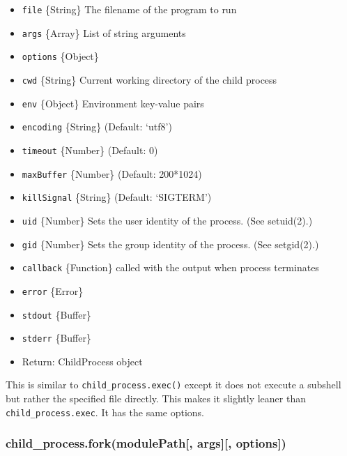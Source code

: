 \begin{itemize}
\itemsep1pt\parskip0pt
\item
  \texttt{file} \{String\} The filename of the program to run
\item
  \texttt{args} \{Array\} List of string arguments
\item
  \texttt{options} \{Object\}
\item
  \texttt{cwd} \{String\} Current working directory of the child process
\item
  \texttt{env} \{Object\} Environment key-value pairs
\item
  \texttt{encoding} \{String\} (Default: `utf8')
\item
  \texttt{timeout} \{Number\} (Default: 0)
\item
  \texttt{maxBuffer} \{Number\} (Default: 200*1024)
\item
  \texttt{killSignal} \{String\} (Default: `SIGTERM')
\item
  \texttt{uid} \{Number\} Sets the user identity of the process. (See
  setuid(2).)
\item
  \texttt{gid} \{Number\} Sets the group identity of the process. (See
  setgid(2).)
\item
  \texttt{callback} \{Function\} called with the output when process
  terminates
\item
  \texttt{error} \{Error\}
\item
  \texttt{stdout} \{Buffer\}
\item
  \texttt{stderr} \{Buffer\}
\item
  Return: ChildProcess object
\end{itemize}

This is similar to \texttt{child\_process.exec()} except it does not
execute a subshell but rather the specified file directly. This makes it
slightly leaner than \texttt{child\_process.exec}. It has the same
options.

\subsubsection{child\_process.fork(modulePath{[}, args{]}{[},
options{]})}\label{childux5fprocess.forkmodulepath-args-options}

